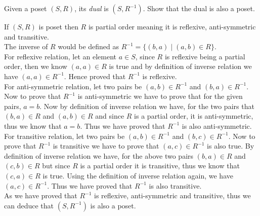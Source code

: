 \documentclass[addpoints]{exam}
\begin{document}
\begin{questions}
\begin{solution}
  \end{solution}
  
\question[5] Given a poset $(S, R)$, its \textit{dual} is $(S,R^{-1})$. Show that the dual is also a poset. 
  \begin{solution}
    If $(S,R)$ is poset then $R$ is partial order meaning it is reflexive, anti-symmetric and transitive.\\ 
    The inverse of $R$ would be defined as $R^{-1}=\{(b,a) \mid (a,b)\in R\}$.\\
    For reflexive relation, let an element $a\in S$, since $R$ is reflexive being a partial order, then we know $(a,a)\in R$ is true and by definition of inverse relation we have $(a,a)\in R^{-1}$. Hence proved that $R^{-1}$ is reflexive.\\
    For anti-symmetric relation, let two pairs be $(a,b)\in R^{-1}$ and $(b,a)\in R^{-1}$. Now to prove that $R^{-1}$ is anti-symmetric we have to prove that for the given pairs, $a=b$. Now by definition of inverse relation we have, for the two pairs that $(b,a)\in R$ and $(a,b)\in R$ and since $R$ is a partial order, it is anti-symmetric, thus we know that $a=b$. Thus we have proved that $R^{-1}$ is also anti-symmetric.
    For transitive relation, let two pairs be $(a,b)\in R^{-1}$ and $(b,c)\in R^{-1}$. Now to prove that $R^{-1}$ is transitive we have to prove that $(a,c)\in R^{-1}$ is also true. By definition of inverse relation we have, for the above two pairs $(b,a)\in R$ and $(c,b)\in R$ but since $R$ is a partial order it is transitive, thus we know that $(c,a)\in R$ is true. Using the definition of inverse relation again, we have $(a,c)\in R^{-1}$. Thus we have proved that $R^{-1}$ is also transitive.\\
    As we have proved that $R^{-1}$ is reflexive, anti-symmetric and transitive, thus we can deduce that $(S,R^{-1})$ is also a poset.
  \end{solution}
  

\end{questions}
\end{document}
